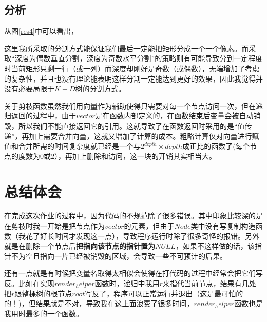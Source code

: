 \documentclass[UTF8]{ctexart}
\begin{document}



	\subsection{分析}\label{time_of_PrintLots}
	\indent 从图\ref{res4}中可以看出，
	
	\indent 这里我所采取的分割方式能保证我们最后一定能把矩形分成一个一个像素。而采取“深度为偶数垂直分割，深度为奇数水平分割”的策略则有可能导致分到一定程度时当前矩形只剩一行（或一列）而深度却刚好是奇数（或偶数），无端增加了考虑的复杂性，并且也没有理论能表明这样分割一定能达到更好的效果，因此我觉得并没有必要局限于$K-D$树的分割方式。
	
	\indent 关于剪枝函数虽然我们用向量作为辅助使得只需要对每一个节点访问一次，但在递归返回的过程中，由于$vector$是在函数内部定义的，在函数结束后变量会被自动销毁，所以我们不能直接返回它的引用。这就导致了在函数返回时采用的是“值传递”，再加上需要合并向量，这就又增加了计算的成本。粗略计算仅对向量进行赋值和合并所需的时间复杂度就已经是一个与$2^{depth}\times depth$成正比的函数了(每个节点的度数为$0$或$2$），再加上删除和访问，这一块的开销其实相当大。
		

	\section{总结体会}
	\indent 在完成这次作业的过程中，因为代码的不规范除了很多错误。其中印象比较深的是在剪枝时我一开始是把节点作为$vector$的元素，但由于$Node$类中没有写复制构造函数（我花了好长时间才发现这一点），导致程序运行时除了很多奇怪的报错。另外就是在删除一个节点后\textbf{把指向该节点的指针置为$NULL$}，如果不这样做的话，该指针不为空且指向一片已经被销毁的区域，会导致一些不可预计的后果。
	
	\indent 还有一点就是有时候把变量名取得太相似会使得在打代码的过程中经常会把它们写反。比如在实现$render_helper$函数时，递归中我用$r$来指代当前节点，结果有几处把$r$跟整棵树的根节点$root$写反了，\textcolor[rgb]{1,0,0}{程序可以正常运行并退出（这是最可怕的的！)}，但结果就是不对，导致我在这上面浪费了很多时间，$render_helper$函数也是我用时最多的一个函数。


\end{document}
